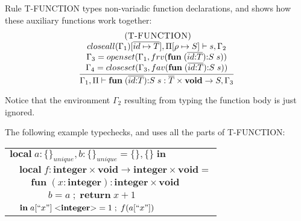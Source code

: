 \documentclass{sigplanconf}
\newcommand{\Integer}{\mathbf{integer}}
\newcommand{\String}{\mathbf{string}}
\newcommand{\Void}{\mathbf{void}}
\newcommand{\mylabel}[1]{\; (\textsc{#1})}
\newcommand{\env}{\Gamma}
\newcommand{\penv}{\Pi}
\newcommand{\ret}{\rho}
\begin{document}
Rule {\sc T-FUNCTION} types non-variadic function declarations,
and shows how these auxiliary functions work together:
\[
\begin{array}{c}
\mylabel{T-FUNCTION}\\
\dfrac{\begin{array}{c}
	closeall(\env_{1})[\overline{id \mapsto T}], \penv[\ret \mapsto S] \vdash s, \env_{2}\\
	\env_{3} = openset(\env_{1}, frv(\mathbf{fun} \; (\overline{id{:}T}){:}S \; s)) \\
	\env_{4} = closeset(\env_{3}, fav(\mathbf{fun} \; (\overline{id{:}T}){:}S \; s))
	\end{array}}
{\env_{1}, \penv \vdash \mathbf{fun} \; (\overline{id{:}T}){:}S \; s:\overline{T} \times \Void \rightarrow S, \env_{3}}
\end{array}
\]

Notice that the environment $\env_{2}$ resulting from
typing the function body is just ignored.

The following example typechecks, and uses all the parts of {\sc T-FUNCTION}:
\begin{center}
\begin{tabular}{llll}
\multicolumn{4}{l}{$\mathbf{local} \; a:\{\}_{unique}, b:\{\}_{unique} = \{\}, \{\} \; \mathbf{in}$}\\
& \multicolumn{3}{l}{$\mathbf{local} \; f:\Integer \times \Void \rightarrow \Integer \times \Void =$}\\
& & \multicolumn{2}{l}{$\mathbf{fun} \; (x:\Integer):\Integer \times \Void$}\\
& & & \multicolumn{1}{l}{$b = a \;;\; \mathbf{return} \; x + 1$}\\
& \multicolumn{3}{l}{$\mathbf{in} \; a[``x"] \; {<}\Integer{>} = 1 \;;\; f(a[``x"])$}\\
\end{tabular}
\end{center}
\end{document}
